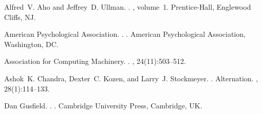 \documentclass[11pt]{article}
\begin{document}
\begin{CJK*}{UTF8}{gbsn}
\begin{thebibliography}{}
Alfred~V. Aho and Jeffrey~D. Ullman.
.
, volume~1.
\newblock Prentice-{Hall}, Englewood Cliffs, NJ.

{American Psychological Association}.
.
.
\newblock American Psychological Association, Washington, DC.

{Association for Computing Machinery}.
.
, 24(11):503--512.

Ashok~K. Chandra, Dexter~C. Kozen, and Larry~J. Stockmeyer.
.
\newblock Alternation.
,
  28(1):114--133.

Dan Gusfield.
.
.
\newblock Cambridge University Press, Cambridge, UK.

\end{thebibliography}

\end{CJK*}
\end{document}
